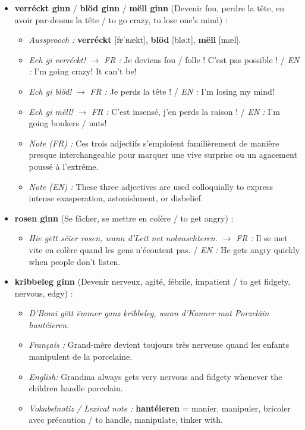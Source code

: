\begin{itemize}
    \item \textbf{verréckt ginn} / \textbf{blöd ginn} / \textbf{mëll ginn} (Devenir fou, perdre la tête, en avoir par-dessus la tête / to go crazy, to lose one's mind) :
    \begin{itemize}
        \item \textit{Aussprooch :} \textbf{verréckt} [fɐˈʀækt], \textbf{blöd} [bløːt], \textbf{mëll} [mæl].
        \item \textit{Ech gi verréckt!} $\rightarrow$ \textit{FR :} Je deviens fou / folle ! C'est pas possible ! / \textit{EN :} I'm going crazy! It can't be!
        \item \textit{Ech gi blöd!} $\rightarrow$ \textit{FR :} Je perds la tête ! / \textit{EN :} I'm losing my mind!
        \item \textit{Ech gi mëll!} $\rightarrow$ \textit{FR :} C'est insensé, j'en perds la raison ! / \textit{EN :} I'm going bonkers / nuts!
        \item \textit{Note (FR) :} Ces trois adjectifs s'emploient familièrement de manière presque interchangeable pour marquer une vive surprise ou un agacement poussé à l'extrême.
        \item \textit{Note (EN) :} These three adjectives are used colloquially to express intense exasperation, astonishment, or disbelief.
    \end{itemize}

    \vspace{0.4em}

    \item \textbf{rosen ginn} (Se fâcher, se mettre en colère / to get angry) :
    \begin{itemize}
        \item \textit{Hie gëtt séier rosen, wann d'Leit net nolauschteren.} $\rightarrow$ \textit{FR :} Il se met vite en colère quand les gens n'écoutent pas. / \textit{EN :} He gets angry quickly when people don't listen.
    \end{itemize}

    \vspace{0.4em}

    \item \textbf{kribbeleg ginn} (Devenir nerveux, agité, fébrile, impatient / to get fidgety, nervous, edgy) :
    \begin{itemize}
        \item \textit{D'Bomi gëtt ëmmer ganz kribbeleg, wann d'Kanner mat Porzeläin hantéieren.}
        \item \textit{Français :} Grand-mère devient toujours très nerveuse quand les enfants manipulent de la porcelaine.
        \item \textit{English:} Grandma always gets very nervous and fidgety whenever the children handle porcelain.
        \item \textit{Vokabelnotiz / Lexical note :} \textbf{hantéieren} = manier, manipuler, bricoler avec précaution / to handle, manipulate, tinker with.
    \end{itemize}


\end{itemize}

